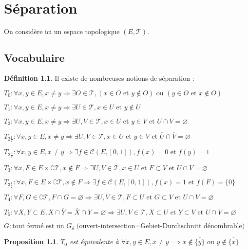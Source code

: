 \documentclass[a4paper, 11pt, french]{book}
\newenvironment{itemise}{\itemize}{\enditemize}
\theoremstyle{plain} %
\newtheorem{proposition}{Proposition}
\theoremstyle{definition} %
\newtheorem{definition}{Définition}
\theoremstyle{remark} %
\newcommand{\1}{\mathds{1}}
\newcommand\vide{\varnothing}
\newcommand{\cont}{\mathcal{C}}
\newcommand\et{\text{ et }}
\newcommand\ou{\text{ ou }}
\begin{document}
\chapter{Séparation}

On considère ici un espace topologique $(E, \mathscr{T})$.

\section{Vocabulaire}

\begin{definition}
	Il existe de nombreuses notions de séparation :
	\begin{itemise}
		\item $T_0:\forall x, y\in E, x\neq y\Rightarrow\exists O\in\mathscr{T}, (x\in O\et y\notin O)\ou(y\in O\et x\notin O)$
		\item $T_1:\forall x, y\in E, x\neq y\Rightarrow\exists U\in\mathscr{T}, x\in U\et y\notin U$
		\item $T_2:\forall x, y\in E, x\neq y\Rightarrow\exists U, V\in\mathscr{T}, x\in U\et y\in V\et U\cap V=\vide$
		\item $T_{2\frac{1}{2}}:\forall x, y\in E, x\neq y\Rightarrow\exists U, V\in\mathscr{T}, x\in U\et y\in V\et\overline{U}\cap\overline{V}=\vide$
		\item $T_{2\frac{3}{4}}:\forall x, y\in E, x\neq y\Rightarrow\exists f\in\cont(E, [0, 1]), f(x)=0\et f(y)=1$
		\item $T_3:\forall x, F\in E\times\complement\mathscr{T}, x\notin F\Rightarrow\exists U, V\in\mathscr{T}, x\in U\et F\subset V\et U\cap V=\vide$
		\item $T_{3\frac{1}{2}}:\forall x, F\in E\times\complement\mathscr{T}, x\notin F\Rightarrow\exists f\in\mathcal{C}(E, [0, 1]), f(x)=1\et f(F)=\{0\}$
		\item $T_4:\forall F, G\in\complement\mathscr{T}, F\cap G=\vide\Rightarrow\exists U, V\in\mathscr{T}, F\subset U\et G\subset V\et U\cap V=\vide$
		\item $T_5:\forall X, Y\subset E, X\cap\overline{Y}=\overline{X}\cap Y=\vide\Rightarrow\exists U, V\in\mathscr{T}, X\subset U\et Y\subset V\et U\cap V=\vide$
		\item $G:\text{tout fermé est un $G_\delta$ (ouvert-intersection=Gebiet-Durchschnitt dénombrable)}$
	\end{itemise}
\end{definition}

\begin{proposition}
	$T_0$ est équivalente à $\forall x, y\in E, x\neq y\implies x\notin\overline{\{y\}}\ou y\notin\overline{\{x\}}$
\end{proposition}
\end{document}

